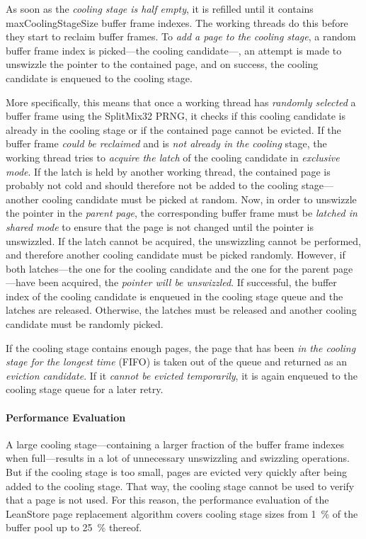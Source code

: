     As soon as the \emph{cooling stage is half empty}, it is refilled until it contains {\scriptsize maxCoolingStageSize} buffer frame indexes. The working threads do this before they start to reclaim buffer frames. To \emph{add a page to the cooling stage}, a random buffer frame index is picked---the cooling candidate---, an attempt is made to unswizzle the pointer to the contained page, and on success, the cooling candidate is enqueued to the cooling stage.

    More specifically, this means that once a working thread has \emph{randomly selected} a buffer frame using the SplitMix32 PRNG, it checks if this cooling candidate is already in the cooling stage or if the contained page cannot be evicted. If the buffer frame \emph{could be reclaimed} and is \emph{not already in the cooling} stage, the working thread tries to \emph{acquire the latch} of the cooling candidate in \emph{exclusive mode}. If the latch is held by another working thread, the contained page is probably not cold and should therefore not be added to the cooling stage---another cooling candidate must be picked at random. Now, in order to unswizzle the pointer in the \emph{parent page}, the corresponding buffer frame must be \emph{latched in shared mode} to ensure that the page is not changed until the pointer is unswizzled. If the latch cannot be acquired, the unswizzling cannot be performed, and therefore another cooling candidate must be picked randomly. However, if both latches---the one for the cooling candidate and the one for the parent page---have been acquired, the \emph{pointer will be unswizzled}. If successful, the buffer index of the cooling candidate is enqueued in the cooling stage queue and the latches are released. Otherwise, the latches must be released and another cooling candidate must be randomly picked.

    If the cooling stage contains enough pages, the page that has been \emph{in the cooling stage for the longest time} (FIFO) is taken out of the queue and returned as an \emph{eviction candidate}. If it \emph{cannot be evicted temporarily}, it is again enqueued to the cooling stage queue for a later retry.

\paragraph{Performance Evaluation}

    A large cooling stage---containing a larger fraction of the buffer frame indexes when full---results in a lot of unnecessary unswizzling and swizzling operations. But if the cooling stage is too small, pages are evicted very quickly after being added to the cooling stage. That way, the cooling stage cannot be used to verify that a page is not used. For this reason, the performance evaluation of the LeanStore page replacement algorithm covers cooling stage sizes from \SI{1}{\percent} of the buffer pool up to \SI{25}{\percent} thereof.

